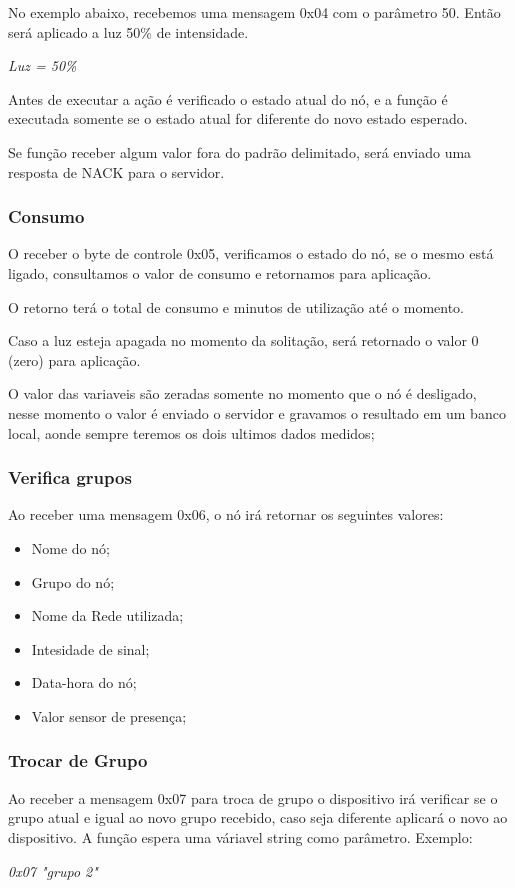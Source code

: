 \documentclass[openright]{normas-utf-tex} %
\begin{document}
No exemplo abaixo, recebemos uma mensagem 0x04 com o parâmetro 50. Então será aplicado a luz 50\% de intensidade.

\begin{center}
    \textit{
    Luz =  50\%
    }
\end{center}

Antes de executar a ação é verificado o estado atual do nó, e a função é executada somente se o estado atual for diferente do novo estado esperado.

Se função receber algum valor fora do padrão delimitado, será enviado uma resposta de NACK para o servidor.

\subsubsection{Consumo}
O receber o byte de controle 0x05, verificamos o estado do nó, se o mesmo está ligado, consultamos o valor de consumo e retornamos para aplicação.

O retorno terá o total de consumo e minutos de utilização até o momento.

Caso a luz esteja apagada no momento da solitação, será retornado o valor 0 (zero) para aplicação.

O valor das variaveis são zeradas somente no momento que o nó é desligado, nesse momento o valor é enviado o servidor e gravamos o resultado em um banco local, aonde sempre teremos os dois ultimos dados medidos;

\subsubsection{Verifica grupos}

Ao receber uma mensagem 0x06, o nó irá retornar os seguintes valores:

\begin{itemize}
    \item Nome do nó;
    \item Grupo do nó;
    \item Nome da Rede utilizada;
    \item Intesidade de sinal;
    \item Data-hora do nó;
    \item Valor sensor de presença;
\end{itemize}

\subsubsection{Trocar de Grupo}
Ao receber a mensagem 0x07 para troca de grupo o dispositivo irá verificar se o grupo atual e igual ao novo grupo recebido, caso seja diferente aplicará o novo ao dispositivo.
A função espera uma váriavel string\cite{Altabooks} como parâmetro.
Exemplo:
\begin{center}
    \textit{
    0x07 "grupo 2"
    }
\end{center}
\end{document}
